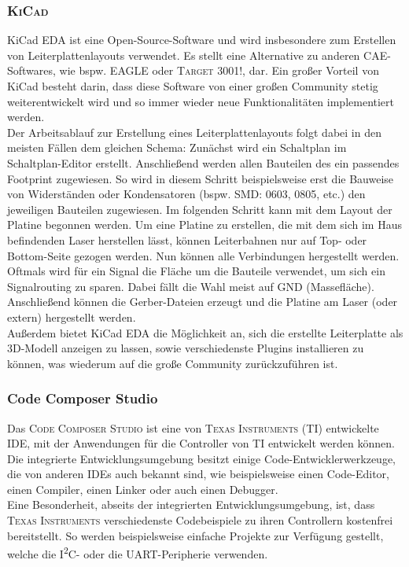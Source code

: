 \documentclass[
	letterpaper, %
	10pt, %
]{CSUniSchoolLabReport}
\begin{document}
\begin{spacing}{1.6}
\subsubsection{\textsc{KiCad}}
KiCad EDA ist eine Open-Source-Software und wird insbesondere zum Erstellen von Leiterplattenlayouts verwendet. Es stellt eine Alternative zu anderen CAE-Softwares, wie bspw. \textsc{EAGLE} oder \textsc{Target 3001!}, dar. Ein großer Vorteil von KiCad besteht darin, dass diese Software von einer großen Community stetig weiterentwickelt wird und so immer wieder neue Funktionalitäten implementiert werden.\\
Der Arbeitsablauf zur Erstellung eines Leiterplattenlayouts folgt dabei in den meisten Fällen dem gleichen Schema: Zunächst wird ein Schaltplan im Schaltplan-Editor erstellt. Anschließend werden allen Bauteilen des ein passendes Footprint zugewiesen. So wird in diesem Schritt beispielsweise erst die Bauweise von Widerständen oder Kondensatoren (bspw. SMD: 0603, 0805, etc.) den jeweiligen Bauteilen zugewiesen.
Im folgenden Schritt kann mit dem Layout der Platine begonnen werden. Um eine Platine zu erstellen, die mit dem sich im Haus befindenden Laser herstellen lässt, können Leiterbahnen nur auf Top- oder Bottom-Seite gezogen werden. Nun können alle Verbindungen hergestellt werden. Oftmals wird für ein Signal die Fläche um die Bauteile verwendet, um sich ein Signalrouting zu sparen. Dabei fällt die Wahl meist auf GND (\glqq Massefläche\grqq). Anschließend können die Gerber-Dateien erzeugt und die Platine am Laser (oder extern) hergestellt werden.\\
Außerdem bietet KiCad EDA die Möglichkeit an, sich die erstellte Leiterplatte als 3D-Modell anzeigen zu lassen, sowie verschiedenste Plugins installieren zu können, was wiederum auf die große Community zurückzuführen ist.

\subsubsection{Code Composer Studio}
Das \textsc{Code Composer Studio} ist eine von \textsc{Texas Instruments} (TI) entwickelte IDE, mit der Anwendungen für die Controller von TI entwickelt werden können. Die integrierte Entwicklungsumgebung besitzt einige Code-Entwicklerwerkzeuge, die von anderen IDEs auch bekannt sind, wie beispielsweise einen Code-Editor, einen Compiler, einen Linker oder auch einen Debugger.\\
Eine Besonderheit, abseits der integrierten Entwicklungsumgebung, ist, dass \textsc{Texas Instruments} verschiedenste Codebeispiele zu ihren Controllern kostenfrei bereitstellt. So werden beispielsweise einfache Projekte zur Verfügung gestellt, welche die I\textsuperscript{2}C- oder die UART-Peripherie verwenden.


\end{spacing}
\end{document}
